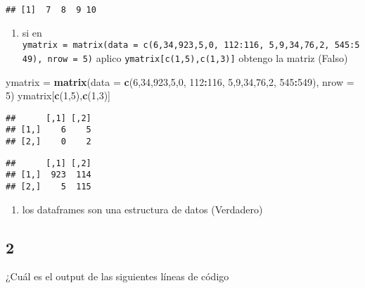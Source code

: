 \documentclass[]{article}
\newenvironment{Shaded}{\begin{snugshade}}{\end{snugshade}}
\newcommand{\KeywordTok}[1]{\textcolor[rgb]{0.13,0.29,0.53}{\textbf{#1}}}
\newcommand{\DataTypeTok}[1]{\textcolor[rgb]{0.13,0.29,0.53}{#1}}
\newcommand{\DecValTok}[1]{\textcolor[rgb]{0.00,0.00,0.81}{#1}}
\newcommand{\StringTok}[1]{\textcolor[rgb]{0.31,0.60,0.02}{#1}}
\newcommand{\OperatorTok}[1]{\textcolor[rgb]{0.81,0.36,0.00}{\textbf{#1}}}
\newcommand{\NormalTok}[1]{#1}
\providecommand{\tightlist}{%
  \setlength{\itemsep}{0pt}\setlength{\parskip}{0pt}}
\begin{document}
\begin{verbatim}
## [1]  7  8  9 10
\end{verbatim}

\begin{enumerate}
\def\labelenumi{\alph{enumi}.}
\setcounter{enumi}{2}
\tightlist
\item
  si en
  \texttt{ymatrix\ =\ matrix(data\ =\ c(6,34,923,5,0,\ 112:116,\ 5,9,34,76,2,\ 545:549),\ nrow\ =\ 5)}
  aplico \texttt{ymatrix{[}c(1,5),c(1,3){]}} obtengo la matriz (Falso)
\end{enumerate}

\begin{Shaded}
\begin{Highlighting}[]
\NormalTok{ymatrix =}\StringTok{ }\KeywordTok{matrix}\NormalTok{(}\DataTypeTok{data =} \KeywordTok{c}\NormalTok{(}\DecValTok{6}\NormalTok{,}\DecValTok{34}\NormalTok{,}\DecValTok{923}\NormalTok{,}\DecValTok{5}\NormalTok{,}\DecValTok{0}\NormalTok{, }\DecValTok{112}\OperatorTok{:}\DecValTok{116}\NormalTok{, }\DecValTok{5}\NormalTok{,}\DecValTok{9}\NormalTok{,}\DecValTok{34}\NormalTok{,}\DecValTok{76}\NormalTok{,}\DecValTok{2}\NormalTok{, }\DecValTok{545}\OperatorTok{:}\DecValTok{549}\NormalTok{), }\DataTypeTok{nrow =} \DecValTok{5}\NormalTok{)}
\NormalTok{ymatrix[}\KeywordTok{c}\NormalTok{(}\DecValTok{1}\NormalTok{,}\DecValTok{5}\NormalTok{),}\KeywordTok{c}\NormalTok{(}\DecValTok{1}\NormalTok{,}\DecValTok{3}\NormalTok{)]}
\end{Highlighting}
\end{Shaded}

\begin{verbatim}
##      [,1] [,2]
## [1,]    6    5
## [2,]    0    2
\end{verbatim}

\begin{verbatim}
##      [,1] [,2]
## [1,]  923  114
## [2,]    5  115
\end{verbatim}

\begin{enumerate}
\def\labelenumi{\alph{enumi}.}
\setcounter{enumi}{3}
\tightlist
\item
  los dataframes son una estructura de datos (Verdadero)
\end{enumerate}

\subsection{2}\label{section-1}

¿Cuál es el output de las siguientes líneas de código
\end{document}
